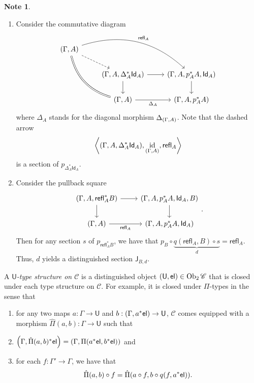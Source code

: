 \documentclass[10pt,letterpaper,cm]{nupset}
\theoremstyle{definition}
\newtheorem{note}[definition]{Note}
\theoremstyle{theorem}
\theoremstyle{remark}
\DeclareMathOperator{\ob}{Ob}
\newcommand{\J}{\mathsf{J}}
\newcommand{\id}{\mathsf{Id}}
\newcommand{\refl}{\mathsf{refl}}
\newcommand{\U}{\mathsf{U}}
\newcommand{\el}{\mathsf{el}}
\newcommand{\0}{\mathbf{0}}
\newcommand{\1}{\mathbf{1}}
\newcommand{\2}{\mathbf{2}}
\renewcommand{\c}{\mathscr{C}}
\DeclareMathOperator{\idd}{id}
\newcommand{\be}{\begin{enumerate}}
\newcommand{\ee}{\end{enumerate}}
\begin{document}
\begin{note} $ $
\be
\item Consider the commutative diagram
\[
\begin{tikzcd}
{\mleft(\Gamma, A\mright)} \arrow[rdd, bend right, equal] \arrow[rrd, "\refl_A", bend left] \arrow[rd, dashed] &                                                                      &                                                          \\
                                                                                                      & {\mleft(\Gamma, A, \Delta_A^{\ast}{\id_A}\mright)} \arrow[d] \arrow[r] & {\mleft(\Gamma, A, p_A^{\ast}{A}, \id_A\mright)} \arrow[d] \\
                                                                                                      & {\mleft(\Gamma, A\mright)} \arrow[r, "\Delta_A"']                      & {\mleft(\Gamma, A, p_A^{\ast}{A}\mright)}                 
\end{tikzcd}
\] where $\Delta_A$ stands for the diagonal morphism $\Delta_{\mleft(\Gamma, A\mright)}$. Note that the dashed arrow $$\mleft\langle \mleft(\Gamma, A, \Delta_A^{\ast}{\id_A}\mright), \idd_{\mleft(\Gamma, A\mright)}, \refl_A\mright\rangle$$ is a section of $p_{\Delta_A^{\ast}{\id_A}}$. 

\item Consider the pullback square
\[
\begin{tikzcd}
{\mleft(\Gamma, A, \refl_A^{\ast}{B}\mright)} \arrow[d] \arrow[r] & {\mleft(\Gamma, A, p_A^{\ast}{A}, \id_A, B\mright)} \arrow[d] \\
{\mleft(\Gamma, A\mright)} \arrow[r, "\refl_A"']           & {\mleft(\Gamma, A, p_A^{\ast}{A}, \id_A\mright)}             
\end{tikzcd}.
\] Then for any section $s$ of $p_{ \refl_A^{\ast}{B}}$, we have that $p_B \circ \underbrace{q(\refl_A, B) \circ s}_{d} = \refl_A$. Thus, $d$ yields a distinguished section $\J_{B, d}$.  
\ee
\end{note}

\medskip

A \textit{$\U$-type structure on $\c$} is a distinguished object $\mleft(\U, \el\mright) \in \ob_{2}{\c}$ that is closed under each type structure on $\c$. For example, it is closed under $\Pi$-types in the sense that
\be[label=(\roman*)]
\item  for any two maps $a: \Gamma \to \U$ and $b: \mleft(\Gamma, a^{\ast}{\el}\mright) \to \U$, $\c$ comes equipped with a morphism $\hat{\Pi}(a,b): \Gamma \to \U$ such that 
\item $\mleft(\Gamma, \hat{\Pi}(a,b)^{\ast}{\el}\mright) = \mleft(\Gamma, \Pi(a^{\ast}{\el}, b^{\ast}{\el})\mright)$ and
\item for each $f: \Gamma' \to \Gamma$, we have that 
$$\hat{\Pi}(a,b) \circ f
= 
\hat{\Pi}\mleft(a\circ f, b \circ q(f, a^{\ast}{\el})\mright).$$
\ee
\end{document}
